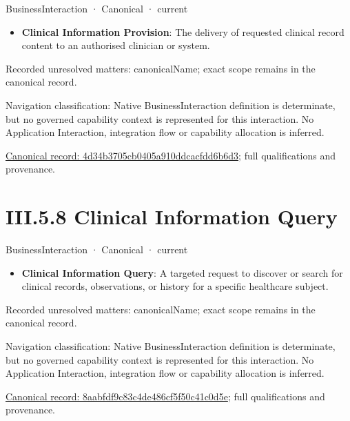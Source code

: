 \label{element:4d34b3705cb0405a910ddcacfdd6b6d3}
{\small BusinessInteraction · Canonical · current}\par

\begin{itemize}


\item \textbf{Clinical Information Provision}: The delivery of requested clinical record content to an authorised clinician or system.

\end{itemize}

{\small Recorded unresolved matters: canonicalName; exact scope remains in the canonical record.}\par
{\small Navigation classification: Native BusinessInteraction definition is determinate, but no governed capability context is represented for this interaction. No Application Interaction, integration flow or capability allocation is inferred.}\par
{\footnotesize \href{../../../../../../../continuum/business/business-interaction/4d34b3705cb0405a910ddcacfdd6b6d3.md}{Canonical record: 4d34b3705cb0405a910ddcacfdd6b6d3}; full qualifications and provenance.}\par
\section*{III.5.8 Clinical Information Query}
\label{navigation:III.5.8}

\label{element:8aabfdf9c83c4de486cf5f50c41c0d5e}
{\small BusinessInteraction · Canonical · current}\par

\begin{itemize}


\item \textbf{Clinical Information Query}: A targeted request to discover or search for clinical records, observations, or history for a specific healthcare subject.

\end{itemize}

{\small Recorded unresolved matters: canonicalName; exact scope remains in the canonical record.}\par
{\small Navigation classification: Native BusinessInteraction definition is determinate, but no governed capability context is represented for this interaction. No Application Interaction, integration flow or capability allocation is inferred.}\par
{\footnotesize \href{../../../../../../../continuum/business/business-interaction/8aabfdf9c83c4de486cf5f50c41c0d5e.md}{Canonical record: 8aabfdf9c83c4de486cf5f50c41c0d5e}; full qualifications and provenance.}\par
